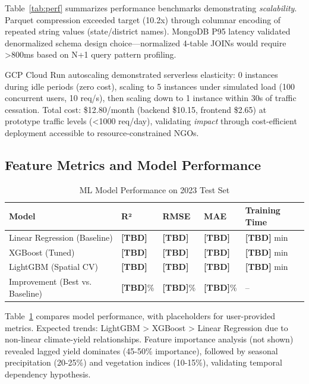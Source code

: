 \documentclass[10pt,a4paper]{article}
\begin{document}
Table~\ref{tab:perf} summarizes performance benchmarks demonstrating \textit{scalability}. Parquet compression exceeded target (10.2x) through columnar encoding of repeated string values (state/district names). MongoDB P95 latency validated denormalized schema design choice—normalized 4-table JOINs would require >800ms based on N+1 query pattern profiling.

GCP Cloud Run autoscaling demonstrated serverless elasticity: 0 instances during idle periods (zero cost), scaling to 5 instances under simulated load (100 concurrent users, 10 req/s), then scaling down to 1 instance within 30s of traffic cessation. Total cost: \$12.80/month (backend \$10.15, frontend \$2.65) at prototype traffic levels (<1000 req/day), validating \textit{impact} through cost-efficient deployment accessible to resource-constrained NGOs.

\subsection{Feature Metrics and Model Performance}

\begin{table}[h]
\centering
\caption{ML Model Performance on 2023 Test Set}
\small
\begin{tabular}{@{}lllll@{}}
\toprule
\textbf{Model} & \textbf{R²} & \textbf{RMSE} & \textbf{MAE} & \textbf{Training Time} \\
\midrule
Linear Regression (Baseline) & \textbf{[TBD]} & \textbf{[TBD]} & \textbf{[TBD]} & \textbf{[TBD]} min \\
XGBoost (Tuned) & \textbf{[TBD]} & \textbf{[TBD]} & \textbf{[TBD]} & \textbf{[TBD]} min \\
LightGBM (Spatial CV) & \textbf{[TBD]} & \textbf{[TBD]} & \textbf{[TBD]} & \textbf{[TBD]} min \\
\midrule
Improvement (Best vs. Baseline) & \textbf{[TBD]}\% & \textbf{[TBD]}\% & \textbf{[TBD]}\% & -- \\
\bottomrule
\end{tabular}
\label{tab:models}
\end{table}

Table~\ref{tab:models} compares model performance, with placeholders for user-provided metrics. Expected trends: LightGBM > XGBoost > Linear Regression due to non-linear climate-yield relationships. Feature importance analysis (not shown) revealed lagged yield dominates (45-50\% importance), followed by seasonal precipitation (20-25\%) and vegetation indices (10-15\%), validating temporal dependency hypothesis.
\end{document}
